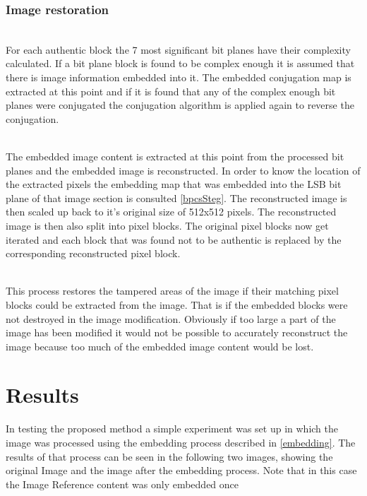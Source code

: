 \documentclass[12pt]{article}
\begin{document}
\subsubsection{Image restoration}
\hspace{0pt} \\
For each authentic block the 7 most significant bit planes have their complexity calculated.
If a bit plane block is found to be complex enough it is assumed that there is image information embedded into it.
The embedded conjugation map is extracted at this point and if it is found that any of the complex enough bit planes were conjugated the conjugation algorithm is applied again to reverse the conjugation.

\hspace{0pt} \\
The embedded image content is extracted at this point from the processed bit planes and the embedded image is reconstructed.
In order to know the location of the extracted pixels the embedding map that was embedded into the LSB bit plane of that image section is consulted \ref{bpcsSteg}.
The reconstructed image is then scaled up back to it's original size of 512x512 pixels.
The reconstructed image is then also split into pixel blocks.
The original pixel blocks now get iterated and each block that was found not to be authentic is replaced by the corresponding reconstructed pixel block. 

\hspace{0pt} \\
This process restores the tampered areas of the image if their matching pixel blocks could be extracted from the image. That is if the embedded blocks were not destroyed in the image modification. Obviously if too large a part of the image has been modified it would not be possible to accurately reconstruct the image because too much of the embedded image content would be lost.

\section{Results} 
In testing the proposed method a simple experiment was set up in which the image was processed using the embedding process described in \ref{embedding}.
The results of that process can be seen in the following two images, showing the original Image and the image after the embedding process.
Note that in this case the Image Reference content was only embedded once
\end{document}
